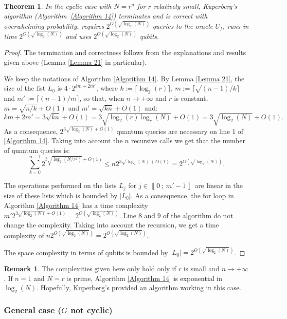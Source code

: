 \documentclass[a4paper,10pt,notitlepage]{report}
\theoremstyle{definition}
\theoremstyle{plain}
\newtheorem{Theorem}[Definition]{Theorem}
\theoremstyle{definition}
\newtheorem{Remark}[Definition]{Remark}
\renewcommand{\i}[2]{\left\llbracket #1~;~#2\right\rrbracket}
\renewcommand{\(}{\left(}
\renewcommand{\)}{\right)}
\begin{document}
\begin{Theorem}
In the cyclic case with $N=r^n$ for $r$ relatively small, Kuperberg's algorithm (Algorithm~\ref{Algorithm 14}) terminates and is correct with overwhelming probability, requires $2^{O(\sqrt{\log_2(N)})}$ queries to the oracle $U_f$, runs in time $2^{O(\sqrt{\log_2(N)})}$ and uses $2^{O(\sqrt{\log_2(N)})}$ qubits.
\end{Theorem}

\begin{proof}
The termination and correctness follows from the explanations and results given above (Lemma \ref{Lemma 21} in particular).

We keep the notations of Algorithm \ref{Algorithm 14}. By Lemma \ref{Lemma  21}, the size of the list $L_0$ is $4\cdot 2^{km+2m'}$, where $k:=\lceil\log_2(r)\rceil$, $m:=\lceil \sqrt{(n-1)/k}\rceil$ and $m':=\lceil (n-1)/m\rceil$, so that, when $n\rightarrow+\infty$ and $r$ is constant, $m=\sqrt{n/k}+O(1)$ and $m'=\sqrt{kn}+O(1)$ and: 
\[km+2m'=3\sqrt{kn}+O(1)=3\sqrt{\log_2(r)\log_r(N)}+O(1)=3\sqrt{\log_2(N)}+O(1).\]
As a consequence, $2^{3\sqrt{\log_2(N)}+O(1)}$ quantum queries are necessary on line 1 of \ref{Algorithm 14}. Taking into account the $n$ recursive calls we get that the number of quantum queries is:
\[\sum_{k=0}^{n-1}2^{3\sqrt{\log_2(N/r^k)}+O(1)}\leq n2^{3\sqrt{\log_2(N)}+O(1)}=2^{O(\sqrt{\log_2(N)})}.\]

The operations performed on the lists $L_j$ for $j\in\i{0}{m'-1}$ are linear in the size of these lists which is bounded by $|L_0|$. As a consequence, the for loop in Algorithm \ref{Algorithm 14} has a time complexity $m'2^{3\sqrt{\log_2(N)}+O(1)}=2^{O(\sqrt{\log_2(N)})}$. Line 8 and 9 of the algorithm do not change the complexity. Taking into account the recursion, we get a time complexity of $n2^{O(\sqrt{\log_2(N)})}=2^{O(\sqrt{\log_2(N)})}$.

The space complexity in terms of qubits is bounded by $|L_0|=2^{O(\sqrt{\log_2(N)})}$.
\end{proof}

\begin{Remark}
The complexities given here only hold only if $r$ is small and $n\rightarrow +\infty$. If $n=1$ and $N=r$ is prime, Algorithm \ref{Algorithm 14} is exponential in $\log_2(N)$.  Hopefully, Kuperberg's provided an algorithm working in this case.
\end{Remark}

\subsubsection{General case ($G$ not cyclic)}
\end{document}
